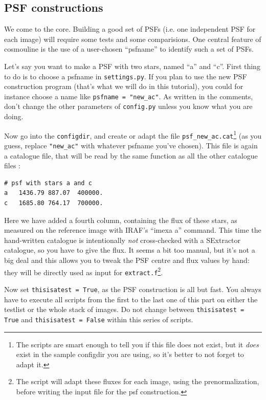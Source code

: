 \subsection{PSF constructions}


We come to the core. Building a good set of PSFs (i.e. one independent PSF for each image) will require some tests and some comparisions. One central feature of cosmouline is the use of a user-chosen ``psfname'' to identify such a set of PSFs. 


Let's say you want to make a PSF with two stars, named ``a'' and ``c''. First thing to do is to choose a psfname in \verb+settings.py+. If you plan to use the new PSF construction program (that's what we will do in this tutorial), you could for instance choose a name like \verb+psfname = "new_ac"+. As written in the comments, don't change the other parameters of \verb+config.py+ unless you know what you are doing.

Now go into the \verb+configdir+, and create or adapt the file \verb+psf_new_ac.cat+\footnote{The scripts are smart enough to tell you if this file does not exist, but it \emph{does} exist in the sample configdir you are using, so it's better to not forget to adapt it.} (as you guess, replace \verb+"new_ac"+ with whatever psfname you've chosen). This file is again a catalogue file, that will be read by the same function as all the other catalogue files :

\begin{Verbatim}[fontsize=\relsize{-2}]
# psf with stars a and c
a	1436.79	887.07	400000.
c	1685.80	764.17	700000.
\end{Verbatim}

Here we have added a fourth column, containing the flux of these stars, as measured on the reference image with IRAF's ``imexa a'' command. This time the hand-written catalogue is intentionally \emph{not} cross-checked with a SExtractor catalogue, so you have to give the flux. It seems a bit too manual, but it's not a big deal and this allows you to tweak the PSF centre and flux values by hand: they will be directly used as input for \verb+extract.f+\footnote{The script will adapt these fluxes for each image, using the prenormalization, before writing the input file for the psf construction.}.


Now set  \verb+thisisatest = True+, as the PSF construction is all but fast. You always have to execute all scripts from the first to the last one of this part on either the testlist or the whole stack of images. Do not change between \verb+thisisatest = True+ and \verb+thisisatest = False+ within this series of scripts.

